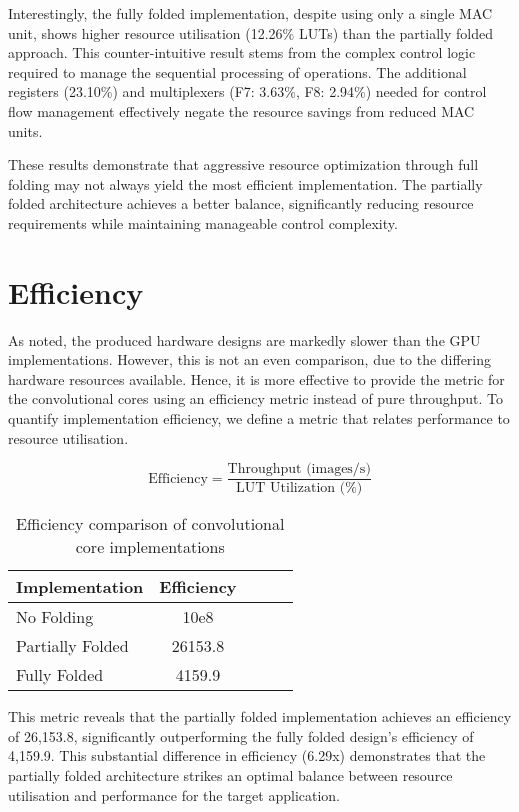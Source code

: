 Interestingly, the fully folded implementation, despite using only a single MAC unit, shows higher resource utilisation (12.26\% LUTs) than the partially folded approach. This counter-intuitive result stems from the complex control logic required to manage the sequential processing of operations. The additional registers (23.10\%) and multiplexers (F7: 3.63\%, F8: 2.94\%) needed for control flow management effectively negate the resource savings from reduced MAC units.

These results demonstrate that aggressive resource optimization through full folding may not always yield the most efficient implementation. The partially folded architecture achieves a better balance, significantly reducing resource requirements while maintaining manageable control complexity.

\section{Efficiency}
As noted, the produced hardware designs are markedly slower than the GPU implementations.
However, this is not an even comparison, due to the differing hardware resources available.
Hence, it is more effective to provide the metric for the convolutional cores using an efficiency metric instead of pure throughput.
To quantify implementation efficiency, we define a metric that relates performance to resource utilisation.

\begin{equation}
    \text{Efficiency} = \frac{\text{Throughput (images/s)}}{\text{LUT Utilization (\%)}}
\end{equation}

\begin{table}[h!]
    \centering
    \caption{Efficiency comparison of convolutional core implementations}
    \label{tab:efficiency_comparison}
    \begin{tabular}{lcccc}
        \toprule
        Implementation & Efficiency \\
        \midrule
        No Folding & 10e8 \\
        Partially Folded & 26153.8 \\
        Fully Folded & 4159.9 \\
        \bottomrule
    \end{tabular}
\end{table}


This metric reveals that the partially folded implementation achieves an efficiency of 26,153.8, significantly outperforming the fully folded design's efficiency of 4,159.9. This substantial difference in efficiency (6.29x) demonstrates that the partially folded architecture strikes an optimal balance between resource utilisation and performance for the target application.

